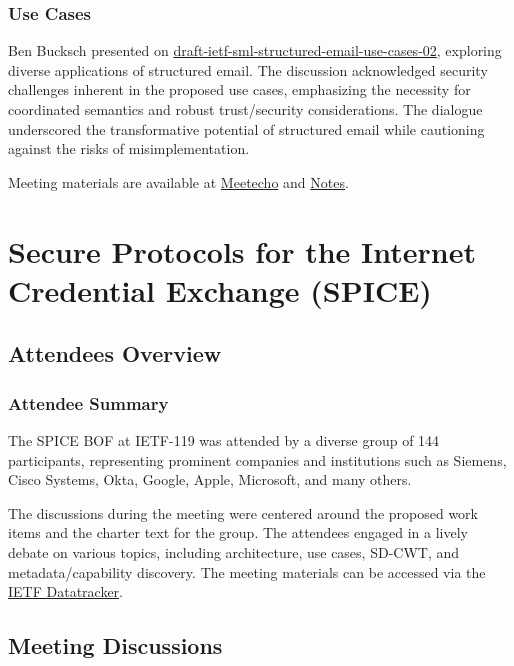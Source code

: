 \documentclass{article}
\begin{document}
\subsubsection{Use Cases}

Ben Bucksch presented on \href{https://datatracker.ietf.org/doc/html/draft-ietf-sml-structured-email-use-cases-02}{draft-ietf-sml-structured-email-use-cases-02}, exploring diverse applications of structured email. The discussion acknowledged security challenges inherent in the proposed use cases, emphasizing the necessity for coordinated semantics and robust trust/security considerations. The dialogue underscored the transformative potential of structured email while cautioning against the risks of misimplementation.

Meeting materials are available at \href{https://meetings.conf.meetecho.com/ietf121/?group=sml&short=&item=1}{Meetecho} and \href{https://notes.ietf.org/notes-ietf-121-sml}{Notes}.




\newpage


\section{Secure Protocols for the Internet Credential Exchange (SPICE)}

\subsection{Attendees Overview}
\subsubsection{Attendee Summary}
The SPICE BOF at IETF-119 was attended by a diverse group of 144 participants, representing prominent companies and institutions such as Siemens, Cisco Systems, Okta, Google, Apple, Microsoft, and many others.

The discussions during the meeting were centered around the proposed work items and the charter text for the group. The attendees engaged in a lively debate on various topics, including architecture, use cases, SD-CWT, and metadata/capability discovery. The meeting materials can be accessed via the \href{https://datatracker.ietf.org/doc/polls-119-spice-202403191300/}{IETF Datatracker}.

\subsection{Meeting Discussions}
\end{document}
